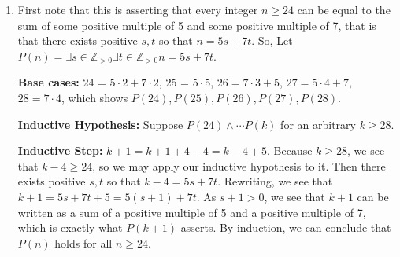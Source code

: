 \documentclass[12pt]{article}
\def\mbb#1{\mathbb{#1}}
\def\bZ{\mbb{Z}}
\theoremstyle{definition}
\theoremstyle{remark}
\newcommand\setItemnumber[1]{\setcounter{enumi}{\numexpr#1-1\relax}}
\begin{document}
\begin{enumerate}
		\setItemnumber{8}
		\item First note that this is asserting that every integer $n \geq 24$ can be equal to the sum of some positive multiple of 5 and some positive multiple of 7, that is that there exists positive $s, t$ so that $n = 5s+7t$. So, 
		Let $P(n) = \exists s \in \bZ_{> 0} \exists t \in \bZ_{>0} n = 5s+7t$.
		
		\textbf{Base cases: } 24 = $5 \cdot 2 + 7 \cdot 2$, 25 = $5 \cdot 5$, $26 = 7 \cdot 3 + 5$, $27 = 5 \cdot 4 + 7$, $28 = 7 \cdot 4$, which shows $P(24), P(25), P(26), P(27), P(28)$.
		
		\textbf{Inductive Hypothesis: } Suppose $P(24) \land \cdots P(k)$ for an arbitrary $k \geq 28$.
		
		\textbf{Inductive Step: } $k + 1 = k + 1 + 4 - 4 = k - 4 + 5$. Because $k \geq 28$, we see that $k-4 \geq 24$, so we may apply our inductive hypothesis to it. Then there exists positive $s, t$ so that $k-4 = 5s+7t$. Rewriting, we see that $k+1 = 5s+7t+5 = 5(s+1)+7t$. As $s+1 > 0$, we see that $k+1$ can be written as a sum of a positive multiple of 5 and a positive multiple of 7, which is exactly what $P(k+1)$ asserts. By induction, we can conclude that $P(n)$ holds for all $n \geq 24$.
		\end{enumerate}
\end{document}
